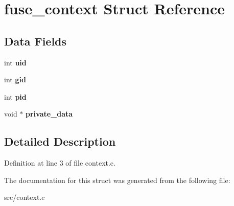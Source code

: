 \hypertarget{structfuse__context}{\section{fuse\-\_\-context \-Struct \-Reference}
\label{structfuse__context}
}
\subsection*{\-Data \-Fields}
\begin{DoxyCompactItemize}
\item 
\hypertarget{structfuse__context_a7cbe070456c3cf0f56a6783864626cfa}{int {\bfseries uid}}\label{structfuse__context_a7cbe070456c3cf0f56a6783864626cfa}

\item 
\hypertarget{structfuse__context_abb0014c73090b48c04886647a22b698e}{int {\bfseries gid}}\label{structfuse__context_abb0014c73090b48c04886647a22b698e}

\item 
\hypertarget{structfuse__context_aa23677276f81629698eed626aa001345}{int {\bfseries pid}}\label{structfuse__context_aa23677276f81629698eed626aa001345}

\item 
\hypertarget{structfuse__context_a198911619cb8ee1a0b11302b94b6027e}{void $\ast$ {\bfseries private\-\_\-data}}\label{structfuse__context_a198911619cb8ee1a0b11302b94b6027e}

\end{DoxyCompactItemize}


\subsection{\-Detailed \-Description}


\-Definition at line 3 of file context.\-c.



\-The documentation for this struct was generated from the following file\-:\begin{DoxyCompactItemize}
\item 
src/context.\-c\end{DoxyCompactItemize}
